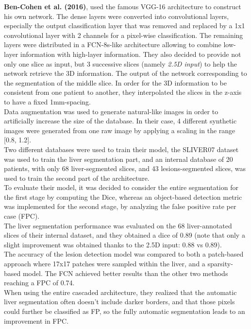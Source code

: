 \textbf{Ben-Cohen et al. (2016)}, used the famous VGG-16 architecture to
construct his own network. The dense layers were converted into
convolutional layers, especially the output classification layer that
was removed and replaced by a 1x1 convolutional layer with 2 channels
for a pixel-wise classification. The remaining layers were distributed
in a FCN-8s-like architecture allowing to combine low-layer information
with high-layer information. They also decided to provide not only one
slice as input, but 3 successive slices (namely \emph{2.5D input}) to
help the network retrieve the 3D information. The output of the network
corresponding to the segmentation of the middle slice. In order for the
3D information to be consistent from one patient to another, they
interpolated the slices in the z-axis to have a fixed 1mm-spacing.\\
Data augmentation was used to generate natural-like images in order to
artificially increase the size of the database. In their case, 4
different synthetic images were generated from one raw image by applying
a scaling in the range {[}0.8, 1.2{]}.\\
Two different databases were used to train their model, the SLIVER07
dataset was used to train the liver segmentation part, and an internal
database of 20 patients, with only 68 liver-segmented slices, and 43
lesions-segmented slices, was used to train the second part of the
architecture.\\
To evaluate their model, it was decided to consider the entire
segmentation for the first stage by computing the Dice, whereas an
object-based detection metric was implemented for the second stage, by
analyzing the false positive rate per case (FPC). \\
The liver segmentation performance was evaluated on the 68
liver-annotated slices of their internal dataset, and they obtained a
dice of 0.89 (note that only a slight improvement was obtained thanks to
the 2.5D input: 0.88 vs 0.89).\\
The accuracy of the lesion detection model was compared to both a
patch-based approach where 17x17 patches were sampled within the liver,
and a sparsity-based model. The FCN achieved better results than the
other two methods reaching a FPC of 0.74.\\
When using the entire cascaded architecture, they realized that the
automatic liver segmentation often doesn't include darker borders, and
that those pixels could further be classified as FP, so the fully
automatic segmentation leads to an improvement in FPC.

